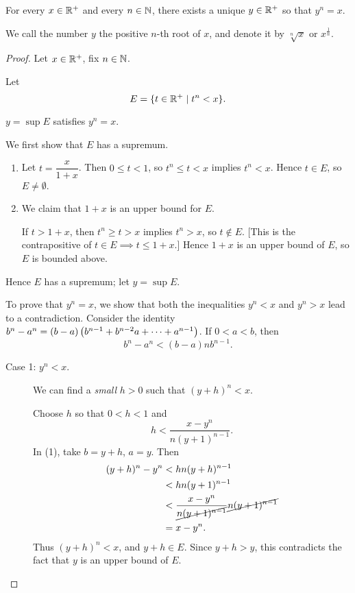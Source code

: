 \begin{proposition}
For every $x\in\mathbb R^+$ and every $n\in\mathbb N$, there exists a unique $y\in\mathbb R^+$ so that $y^n=x$.
\end{proposition}

We call the number $y$ the positive $n$-th root of $x$, and denote it by $\sqrt[n]{x}$ or $x^\frac{1}{n}$.

\begin{proof}
Let $x\in\mathbb R^+$, fix $n\in\mathbb N$.

 Let
\[E=\{t\in\mathbb R^+\mid t^n<x\}.\]

\begin{claim}
$y=\sup E$ satisfies $y^n=x$.
\end{claim}
We first show that $E$ has a supremum.
\begin{enumerate}[label=(\roman*)]
\item Let $t=\dfrac{x}{1+x}$. Then $0\le t<1$, so $t^n\le t<x$ implies $t^n<x$. Hence $t\in E$, so $E\neq\emptyset$.
\item We claim that $1+x$ is an upper bound for $E$.

If $t>1+x$, then $t^n\ge t>x$ implies $t^n>x$, so $t\notin E$. [This is the contrapositive of $t\in E\implies t\le1+x$.] Hence $1+x$ is an upper bound of $E$, so $E$ is bounded above.
\end{enumerate}
Hence $E$ has a supremum; let $y=\sup E$.

To prove that $y^n=x$, we show that both the inequalities $y^n<x$ and $y^n>x$ lead to a contradiction. Consider the identity $b^n-a^n=(b-a)\left(b^{n-1}+b^{n-2}a+\cdots+a^{n-1}\right)$. If $0<a<b$, then
\begin{equation*}\tag{1}
b^n-a^n<(b-a)nb^{n-1}.
\end{equation*}
\begin{description}
\item[Case 1: $y^n<x$.] 
\begin{idea}
We can find a \emph{small} $h>0$ such that $(y+h)^n<x$.
\end{idea}
Choose $h$ so that $0<h<1$ and
\[h<\frac{x-y^n}{n(y+1)^{n-1}}.\]
In (1), take $b=y+h$, $a=y$. Then
\begin{align*}
(y+h)^n-y^n
&<hn(y+h)^{n-1}\\
&<hn(y+1)^{n-1}\\
&<\frac{x-y^n}{\cancel{n(y+1)^{n-1}}}\cancel{n(y+1)^{n-1}}\\
&=x-y^n.
\end{align*}
Thus $(y+h)^n<x$, and $y+h\in E$. Since $y+h>y$, this contradicts the fact that $y$ is an upper bound of $E$.


\end{description}
\end{proof}
